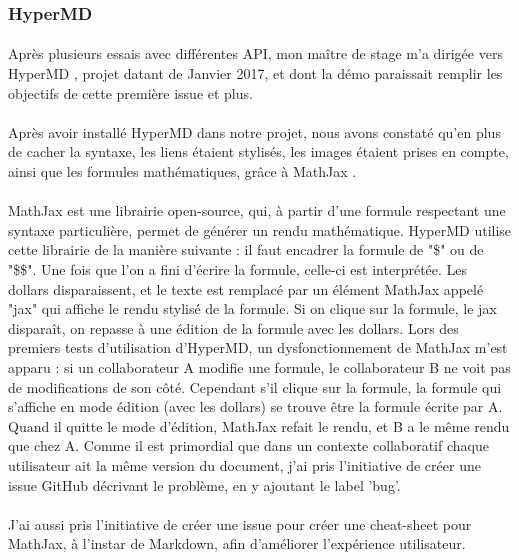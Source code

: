 \documentclass[12pt]{article}
\begin{document}
\subsubsection{HyperMD}
\paragraph{}
Après plusieurs essais avec différentes API, mon maître de stage m'a dirigée vers HyperMD \cite{hypermd}, projet datant de Janvier 2017, et dont la démo \cite{demo} paraissait remplir les objectifs de cette première issue et plus.
\paragraph{}
Après avoir installé HyperMD dans notre projet, nous avons constaté qu'en plus de cacher la syntaxe, les liens étaient stylisés, les images étaient prises en compte, ainsi que les formules mathématiques, grâce à MathJax \cite{mathjax}.
\paragraph{}
MathJax est une librairie open-source, qui, à partir d'une formule respectant une syntaxe particulière, permet de générer un rendu mathématique. HyperMD utilise cette librairie de la manière suivante : il faut encadrer la formule de "\$" ou de "\$\$". Une fois que l'on a fini d'écrire la formule, celle-ci est interprétée. Les dollars disparaissent, et le texte est remplacé par un élément MathJax appelé "jax" qui affiche le rendu stylisé de la formule. Si on clique sur la formule, le jax disparaît, on repasse à une édition de la formule avec les dollars. Lors des premiers tests d'utilisation d'HyperMD, un dysfonctionnement de MathJax m'est apparu : si un collaborateur A modifie une formule, le collaborateur B ne voit pas de modifications de son côté. Cependant s'il clique sur la formule, la formule qui s'affiche en mode édition (avec les dollars) se trouve être la formule écrite par A. Quand il quitte le mode d'édition, MathJax refait le rendu, et B a le même rendu que chez A. Comme il est primordial que dans un contexte collaboratif chaque utilisateur ait la même version du document, j'ai pris l'initiative de créer une issue GitHub décrivant le problème, en y ajoutant le label 'bug'.
\paragraph{}
J'ai aussi pris l'initiative de créer une issue pour créer une cheat-sheet pour MathJax, à l'instar de Markdown, afin d'améliorer l'expérience utilisateur.\\
\end{document}
